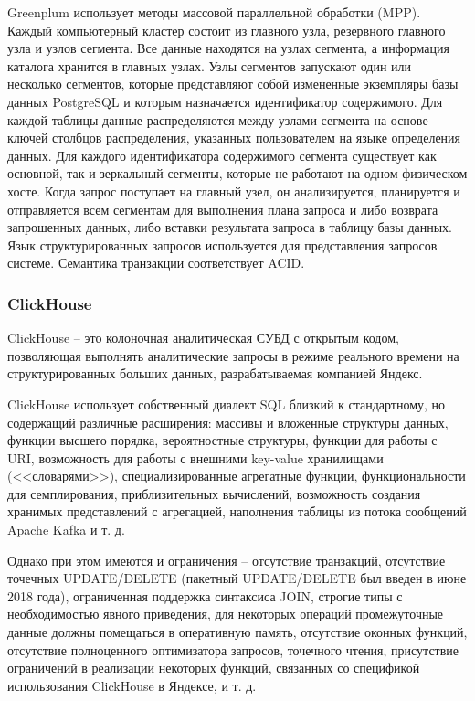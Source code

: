 Greenplum использует методы массовой параллельной обработки (MPP). Каждый компьютерный кластер состоит из главного узла, резервного главного узла и узлов сегмента. Все данные находятся на узлах сегмента, а информация каталога хранится в главных узлах. Узлы сегментов запускают один или несколько сегментов, которые представляют собой измененные экземпляры базы данных PostgreSQL и которым назначается идентификатор содержимого. Для каждой таблицы данные распределяются между узлами сегмента на основе ключей столбцов распределения, указанных пользователем на языке определения данных. Для каждого идентификатора содержимого сегмента существует как основной, так и зеркальный сегменты, которые не работают на одном физическом хосте. Когда запрос поступает на главный узел, он анализируется, планируется и отправляется всем сегментам для выполнения плана запроса и либо возврата запрошенных данных, либо вставки результата запроса в таблицу базы данных. Язык структурированных запросов используется для представления запросов системе. Семантика транзакции соответствует ACID.

\subsubsection{ClickHouse}

ClickHouse \cite{clickhouse} -- это колоночная аналитическая СУБД с открытым кодом, позволяющая выполнять аналитические запросы в режиме реального времени на структурированных больших данных, разрабатываемая компанией Яндекс.

ClickHouse использует собственный диалект SQL близкий к стандартному, но содержащий различные расширения: массивы и вложенные структуры данных, функции высшего порядка, вероятностные структуры, функции для работы с URI, возможность для работы с внешними key-value хранилищами (<<словарями>>), специализированные агрегатные функции, функциональности для семплирования, приблизительных вычислений, возможность создания хранимых представлений с агрегацией, наполнения таблицы из потока сообщений Apache Kafka и т. д.

Однако при этом имеются и ограничения -- отсутствие транзакций, отсутствие точечных UPDATE/DELETE (пакетный UPDATE/DELETE был введен в июне 2018 года), ограниченная поддержка синтаксиса JOIN, строгие типы с необходимостью явного приведения, для некоторых операций промежуточные данные должны помещаться в оперативную память, отсутствие оконных функций, отсутствие полноценного оптимизатора запросов, точечного чтения, присутствие ограничений в реализации некоторых функций, связанных со спецификой использования ClickHouse в Яндексе, и т. д.

